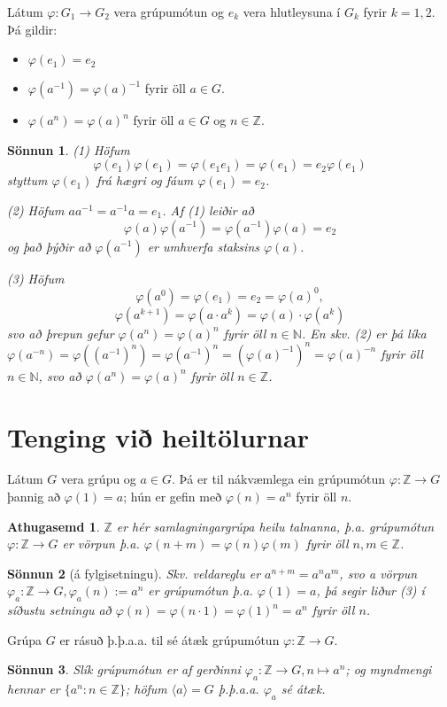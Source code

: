 \documentclass[a4paper,icelandic,11pt]{book}
\theoremstyle{plain}
\newtheorem*{ath}{Athugasemd}
\newtheorem*{sonnun}{Sönnun}
\newcommand{\N}{\mathbb{N}}
\newcommand{\Z}{\mathbb{Z}}
\begin{document}
\begin{setn}
  Látum $\varphi:G_1\to G_2$ vera grúpumótun og $e_k$ vera hlutleysuna í $G_k$
  fyrir $k=1,2$. Þá gildir:
  \begin{itemize}
    \item[(1)] $\varphi(e_1) = e_2$
    \item[(2)] $\varphi(a^{-1}) = \varphi(a)^{-1}$ fyrir öll $a\in G$.
    \item[(3)] $\varphi(a^n)= \varphi(a)^n$ fyrir öll $a\in G$ og $n\in \Z$.
  \end{itemize}
\end{setn}
\begin{sonnun}
  
  (1) Höfum 
  \[
  \varphi(e_1)\varphi(e_1) = \varphi(e_1 e_1) = \varphi(e_1) = e_2\varphi(e_1)
  \]
  styttum $\varphi(e_1)$ frá hægri og fáum $\varphi(e_1) = e_2$.
  
  (2) Höfum $aa^{-1}=a^{-1}a = e_1$. Af (1) leiðir að
  \[
    \varphi(a) \varphi(a^{-1}) = \varphi(a^{-1})\varphi(a) = e_2
  \]
  og það þýðir að $\varphi(a^{-1})$ er umhverfa staksins $\varphi(a)$.
  
  (3) Höfum 
  \[
  \varphi(a^0) = \varphi(e_1) = e_2 = \varphi(a)^0,
  \]
  \[
  \varphi(a^{k+1}) 
  = \varphi(a\cdot a^k) 
  = \varphi(a)\cdot\varphi(a^k)
  \]
  svo að þrepun gefur $\varphi(a^n)=\varphi(a)^n$ fyrir öll $n\in \N$. En skv.
  (2) er þá líka $\varphi(a^{-n}) = \varphi((a^{-1})^n)=\varphi(a^{-1})^n =
  (\varphi(a)^{-1})^n = \varphi(a)^{-n}$ fyrir öll $n\in \N$, svo að
  $\varphi(a^n) = \varphi(a)^n$ fyrir öll $n\in\Z$.
\end{sonnun}

\section{Tenging við heiltölurnar}
\begin{fylgisetn}
  Látum $G$ vera grúpu og $a\in G$. Þá er til nákvæmlega ein grúpumótun
  $\varphi:\Z\to G$ þannig að $\varphi(1) = a$; hún er gefin með
  $\varphi(n)=a^n$ fyrir öll $n$.
\end{fylgisetn}
\begin{ath}
  $\Z$ er hér \emph{samlagningargrúpa} heilu talnanna, þ.a. grúpumótun $\varphi
  :\Z \to G$ er vörpun þ.a. $\varphi(n+m)=\varphi(n)\varphi(m)$ fyrir öll
  $n,m\in \Z$.
\end{ath}
\begin{sonnun}
  [á fylgisetningu]
  Skv. veldareglu er $a^{n+m} = a^n a^m$, svo a vörpun $\varphi_a:\Z\to G,
  \varphi_a(n) := a^n$ er grúpumótun þ.a. $\varphi(1) = a$, þá segir liður (3) í
  síðustu setningu að $\varphi(n) = \varphi(n\cdot 1) = \varphi(1)^n=a^n$ fyrir
  öll $n$.
\end{sonnun}
\begin{fylgisetn}
  Grúpa $G$ er rásuð þ.þ.a.a. til sé átæk grúpumótun $\varphi:\Z\to G$.
\end{fylgisetn}
\begin{sonnun}
  Slík grúpumótun er af gerðinni $\varphi_a:\Z\to G, n\mapsto a^n$; og myndmengi
  hennar er $\{a^n:n\in \Z \}$; höfum $\langle a \rangle = G$ þ.þ.a.a.
  $\varphi_a$ sé átæk.
\end{sonnun}
\end{document}

